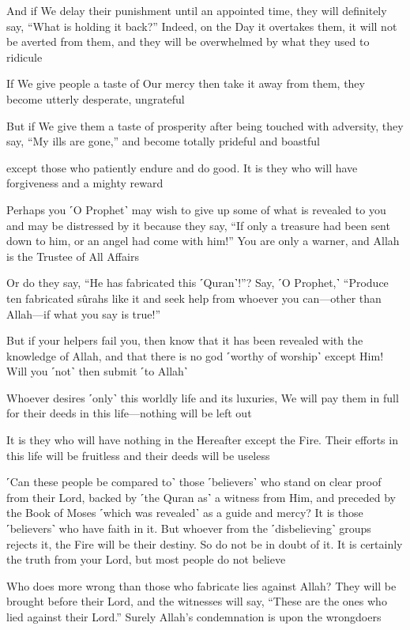 And if We delay their punishment until an appointed time, they will definitely say, “What is holding it back?” Indeed, on the Day it overtakes them, it will not be averted from them, and they will be overwhelmed by what they used to ridicule

If We give people a taste of Our mercy then take it away from them, they become utterly desperate, ungrateful

But if We give them a taste of prosperity after being touched with adversity, they say, “My ills are gone,” and become totally prideful and boastful

except those who patiently endure and do good. It is they who will have forgiveness and a mighty reward

Perhaps you ˹O Prophet˺ may wish to give up some of what is revealed to you and may be distressed by it because they say, “If only a treasure had been sent down to him, or an angel had come with him!” You are only a warner, and Allah is the Trustee of All Affairs

Or do they say, “He has fabricated this ˹Quran˺!”? Say, ˹O Prophet,˺ “Produce ten fabricated sûrahs like it and seek help from whoever you can—other than Allah—if what you say is true!”

But if your helpers fail you, then know that it has been revealed with the knowledge of Allah, and that there is no god ˹worthy of worship˺ except Him! Will you ˹not˺ then submit ˹to Allah˺

Whoever desires ˹only˺ this worldly life and its luxuries, We will pay them in full for their deeds in this life—nothing will be left out

It is they who will have nothing in the Hereafter except the Fire. Their efforts in this life will be fruitless and their deeds will be useless

˹Can these people be compared to˺ those ˹believers˺ who stand on clear proof from their Lord, backed by ˹the Quran as˺ a witness from Him, and preceded by the Book of Moses ˹which was revealed˺ as a guide and mercy? It is those ˹believers˺ who have faith in it. But whoever from the ˹disbelieving˺ groups rejects it, the Fire will be their destiny. So do not be in doubt of it. It is certainly the truth from your Lord, but most people do not believe

Who does more wrong than those who fabricate lies against Allah? They will be brought before their Lord, and the witnesses will say, “These are the ones who lied against their Lord.” Surely Allah’s condemnation is upon the wrongdoers

